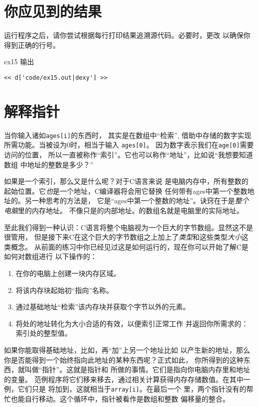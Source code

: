 \section{你应见到的结果}

运行程序之后，请你尝试根据每行打印结果追溯源代码。必要时，更改
以确保你得到正确的行号。

\begin{code}{ex15 输出}
\begin{lstlisting}
<< d['code/ex15.out|dexy'] >>
\end{lstlisting}
\end{code}


\section{解释指针}

当你输入诸如\verb|ages[i]|的东西时， 其实是在数组中“检索”,
借助中存储的数字实现所需功能。当被设为0时，相当于输入
\verb|ages[0]|。 因为数字表示我们在\verb|age[0]|需要访问的位置，
所以一直被称作“索引”。它也可以称作“地址”，比如说“我想要知道数组
中地址的整数是多少？”

如果是一个索引，那么又是什么呢？对于C语言来说
是电脑内存中，所有整数的起始位置。它\emph{也}是一个地址，C编译器将会用它替换
任何带有ages中第一个整数地址的。另一种思考的方法是，
它是“ages中第一个整数的地址”。诀窍在于是\emph{整个电脑}里的内存地址。
不像只是的内部地址。的数组名就是电脑里的实际地址。

至此我们得到一种认识：C语言将整个电脑视为一个巨大的字节数组。显然这不是很管用，
但是接下来C在这个巨大的字节数组之上加上了\emph{类型}和这些类型\emph{大小}这类概念。
从前面的练习中你已经见过这是如何运行的，现在你可以开始了解C是如何对数组进行
以下操作的：

\begin{enumerate}
\item 在你的电脑上创建一块内存区域。
\item 将该内存块起始初“指向”名称。
\item 通过基础地址“检索”该内存块并获取个字节以外的元素。
\item 将处的地址转化为大小合适的有效，以便索引正常工作
      并返回你所需求的：索引处的整型值。
\end{enumerate}

如果你能取得基础地址，比如，再“加”上另一个地址比如
以产生新的地址，那么你是否能得到一个始终指向此地址的某种东西呢？正式如此，
你所得到的这种东西，就叫做“指针”。这就是指针和
所做的事情。它们是指向你电脑内存里和地址的变量。
范例程序将它们移来移去，通过相关计算获得内存存储数值。在其中一例，它们只是
将加到，这就相当于\verb|array[i]|。在最后一个
里，两个指针没有的帮忙也能自行移动。这个循环中，指针被看作是数组和整数
偏移量的整合。

